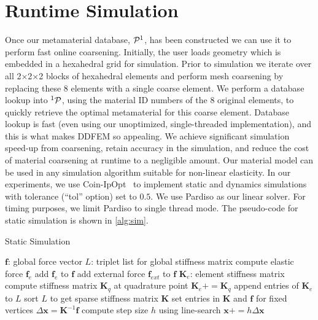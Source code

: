 \section{Runtime Simulation}
\label{sec:runtime}
Once our metamaterial database, $\mathcal{P}^1$, has been constructed we can use it to perform fast online coarsening. 
Initially, the user loads geometry which is embedded in a hexahedral grid for simulation. Prior to simulation we iterate over all 2$\times$2$\times$2 blocks of hexahedral elements and perform mesh coarsening by replacing these 8 elements with a single coarse element. We perform a database lookup into $^1\mathcal{P}$, using the material ID numbers of the 8 original elements, to quickly retrieve the optimal metamaterial for this coarse element. Database lookup is fast (even using our unoptimized, single-threaded implementation), and this is what makes DDFEM so appealing.
We achieve significant simulation speed-up from coarsening, retain accuracy in the simulation, and reduce the cost of material coarsening at runtime to a negligible amount.
	Our material model can be used in any simulation algorithm suitable for non-linear elasticity. In our experiments, we use Coin-IpOpt~\cite{ipopt} to implement static and dynamics simulations with tolerance (``tol'' option) set to $0.5$. We use Pardiso as our linear solver.
	For timing purposes, we limit Pardiso to single thread mode.
	The pseudo-code for static simulation is shown in \autoref{alg:sim}.
\begin{algorithm}[!h]
	
	\caption{Static Simulation}\label{alg:sim}
	\begin{algorithmic}[1]
		\REPEAT
		\STATE $\mathbf{f}$: global force vector
		\STATE $L$: triplet list for global stiffness matrix
		\STATE compute elastic force $\mathbf{f}_e$
		\STATE add $\mathbf{f}_e$ to $\mathbf{f}$
		\ENDFOR
		\STATE add external force $\mathbf{f}_{ext}$ to $\mathbf{f}$
		\STATE $\mathbf{K}_e$: element stiffness matrix
		\STATE compute stiffness matrix $\mathbf{K}_q$ at quadrature point
		\STATE $\mathbf{K}_e+=\mathbf{K}_q$
		\ENDFOR
		\STATE append entries of $\mathbf{K}_e$ to $L$
		\ENDFOR
		\STATE sort $L$ to get sparse stiffness matrix $\mathbf{K}$
		\STATE set entries in $\mathbf{K}$ and $\mathbf{f}$ for fixed vertices
		\STATE $\Delta\mathbf{x}=\mathbf{K}^{-1}\mathbf{f}$
		\STATE compute step size $h$ using line-search
		\STATE $\mathbf{x}+=h\Delta\mathbf{x}$
	\end{algorithmic}
\end{algorithm}

